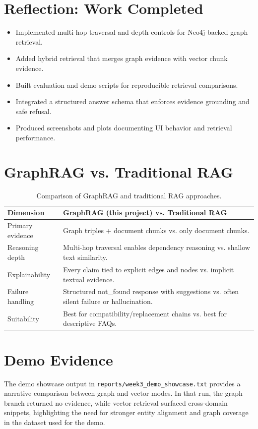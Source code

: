 \documentclass[11pt,a4paper]{article}
\begin{document}
\section{Reflection: Work Completed}
\begin{itemize}
    \item Implemented multi-hop traversal and depth controls for Neo4j-backed graph retrieval.
    \item Added hybrid retrieval that merges graph evidence with vector chunk evidence.
    \item Built evaluation and demo scripts for reproducible retrieval comparisons.
    \item Integrated a structured answer schema that enforces evidence grounding and safe refusal.
    \item Produced screenshots and plots documenting UI behavior and retrieval performance.
\end{itemize}

\section{GraphRAG vs. Traditional RAG}
\begin{table}[H]
\centering
\small
\setlength{\tabcolsep}{6pt}
\begin{tabularx}{\textwidth}{L{0.30\textwidth}Y}
\toprule
{}
\textbf{Dimension} & \textbf{GraphRAG (this project) vs. Traditional RAG} \\
\midrule
Primary evidence & Graph triples + document chunks vs. only document chunks. \\
Reasoning depth & Multi-hop traversal enables dependency reasoning vs. shallow text similarity. \\
Explainability & Every claim tied to explicit edges and nodes vs. implicit textual evidence. \\
Failure handling & Structured not\_found response with suggestions vs. often silent failure or hallucination. \\
Suitability & Best for compatibility/replacement chains vs. best for descriptive FAQs. \\
\bottomrule
\end{tabularx}
\caption{Comparison of GraphRAG and traditional RAG approaches.}
\label{tab:graphrag-vs-rag}
\end{table}

\section{Demo Evidence}
The demo showcase output in \texttt{reports/week3\_demo\_showcase.txt} provides a narrative comparison between graph and vector modes. In that run, the graph branch returned no evidence, while vector retrieval surfaced cross-domain snippets, highlighting the need for stronger entity alignment and graph coverage in the dataset used for the demo.
\end{document}

